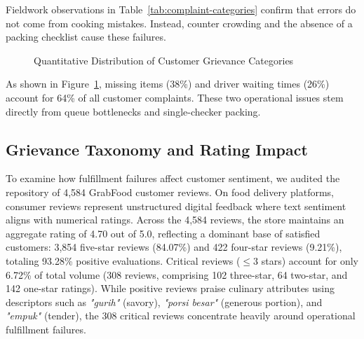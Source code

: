 \documentclass{jomas}
\begin{document}
Fieldwork observations in Table~\ref{tab:complaint-categories} confirm that errors do not come from cooking mistakes. Instead, counter crowding and the absence of a packing checklist cause these failures.

\begin{figure}[b]
\centering
{}
\caption{Quantitative Distribution of Customer Grievance Categories}
\label{fig:complaint-distribution}
\end{figure}

As shown in Figure~\ref{fig:complaint-distribution}, missing items (38\%) and driver waiting times (26\%) account for 64\% of all customer complaints. These two operational issues stem directly from queue bottlenecks and single-checker packing.

\subsection{Grievance Taxonomy and Rating Impact}
To examine how fulfillment failures affect customer sentiment, we audited the repository of 4,584 GrabFood customer reviews. On food delivery platforms, consumer reviews represent unstructured digital feedback where text sentiment aligns with numerical ratings. Across the 4,584 reviews, the store maintains an aggregate rating of 4.70 out of 5.0, reflecting a dominant base of satisfied customers: 3,854 five-star reviews (84.07\%) and 422 four-star reviews (9.21\%), totaling 93.28\% positive evaluations. Critical reviews ($\le 3$ stars) account for only 6.72\% of total volume (308 reviews, comprising 102 three-star, 64 two-star, and 142 one-star ratings). While positive reviews praise culinary attributes using descriptors such as \textit{"gurih"} (savory), \textit{"porsi besar"} (generous portion), and \textit{"empuk"} (tender), the 308 critical reviews concentrate heavily around operational fulfillment failures.
\end{document}
